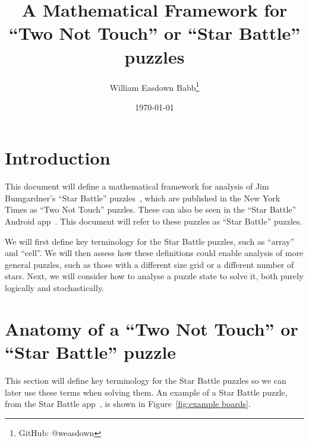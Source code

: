 \documentclass[titlepage]{article} %
\title{A Mathematical Framework for “Two Not Touch” or “Star Battle” puzzles}
\date{\today{}}
\author{William Easdown Babb\thanks{GitHub: @weasdown}}
\begin{document}
\maketitle
\section{Introduction}
This document will define a mathematical framework for analysis of Jim Bumgardner’s “Star Battle” puzzles~\cite{krazydad}, which are published in the New York Times as “Two Not Touch” puzzles. These can also be seen in the “Star Battle” Android app~\cite{stars-app}. This document will refer to these puzzles as “Star Battle” puzzles.

We will first define key terminology for the Star Battle puzzles, such as “array” and “cell”. We will then assess how these definitions could enable analysis of more general puzzles, such as those with a different size grid or a different number of stars. Next, we will consider how to analyse a puzzle state to solve it, both purely logically and stochastically.


\pagebreak
\section{Anatomy of a “Two Not Touch” or “Star Battle” puzzle}
This section will define key terminology for the Star Battle puzzles so we can later use these terms when solving them.
An example of a Star Battle puzzle, from the Star Battle app~\cite{stars-app}, is shown in Figure~\ref{fig:example boards}.
\end{document}
